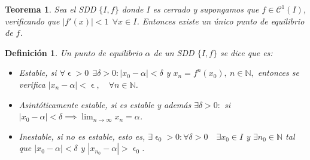 \documentclass[11pt, a4paper, titlepage]{article}
\let\epsilon\upvarepsilon
\theoremstyle{theorem-style}
\newtheorem*{nth}{Teorema}
\theoremstyle{definition-style}
\newtheorem*{ndef}{Definición}
\theoremstyle{remark-style}
\theoremstyle{example-style}
\begin{document}
\begin{nth}
	Sea el SDD $\{I,f\}$ donde $I$ es cerrado y supongamos que $f\in \mathcal{C}^1(I)$, verificando que $|f'(x)|< 1 \ \ \forall x \in I$. Entonces existe un único punto de equilibrio de $f$.
\end{nth}

\begin{ndef}
	Un punto de equilibrio $\alpha$ de un SDD $\{I,f\}$ se dice que es:
	\begin{itemize}
	\item Estable, si $\forall \epsilon > 0 \ \ \exists \delta > 0 : |x_0 - \alpha| < \delta$ y $x_n = f^n(x_0),\ n \in \mathbb{N},$ entonces se verifica $|x_n - \alpha| < \epsilon, \quad \forall n \in \mathbb{N}$.
	\item Asintóticamente estable, si es estable y además $\exists \delta > 0 :$ si $|x_0 - \alpha| < \delta \implies \lim_{n\to \infty}x_n = \alpha$.
	\item Inestable, si no es estable, esto es, $\exists \epsilon_0 > 0 : \forall \delta > 0\quad \exists x_0 \in I$ y $\exists n_0 \in \mathbb{N}$ tal que $|x_0 - \alpha| < \delta$ y $|x_{n_0} - \alpha| > \epsilon_0$.
\end{itemize}
\end{ndef}
\end{document}
